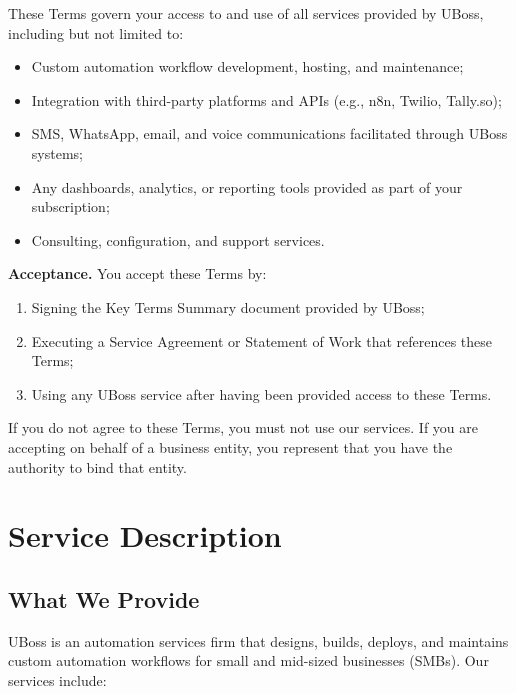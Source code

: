 \documentclass[11pt,letterpaper,parskip=half]{scrartcl}
\begin{document}
These Terms govern your access to and use of all services provided by UBoss, including but not limited to:

\begin{itemize}[nosep, leftmargin=1.5em]
    \item Custom automation workflow development, hosting, and maintenance;
    \item Integration with third-party platforms and APIs (e.g., n8n, Twilio, Tally.so);
    \item SMS, WhatsApp, email, and voice communications facilitated through UBoss systems;
    \item Any dashboards, analytics, or reporting tools provided as part of your subscription;
    \item Consulting, configuration, and support services.
\end{itemize}

\textbf{Acceptance.} You accept these Terms by:
\begin{enumerate}[nosep, leftmargin=1.5em]
    \item Signing the Key Terms Summary document provided by UBoss;
    \item Executing a Service Agreement or Statement of Work that references these Terms;
    \item Using any UBoss service after having been provided access to these Terms.
\end{enumerate}

If you do not agree to these Terms, you must not use our services. If you are accepting on behalf of a business entity, you represent that you have the authority to bind that entity.

\section{Service Description}

\subsection{What We Provide}

UBoss is an automation services firm that designs, builds, deploys, and maintains custom automation workflows for small and mid-sized businesses (SMBs). Our services include:
\end{document}
